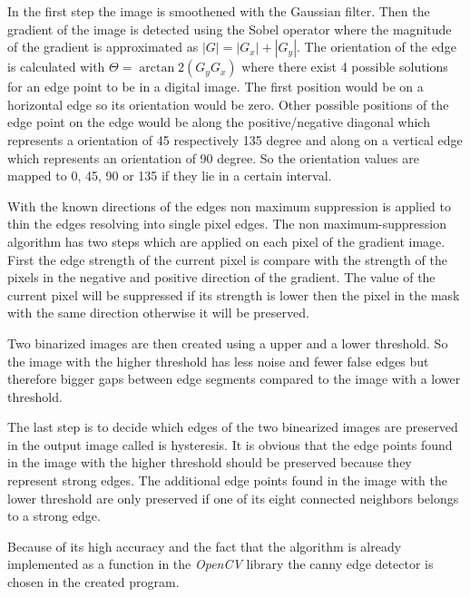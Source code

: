In the first step the image is smoothened with the Gaussian filter. 
Then the gradient of the image is detected using the Sobel operator where the magnitude of the gradient is approximated as $|G| = |G_x| + |G_y|$. 
The orientation of the edge is calculated with $\Theta = \arctan2(G_y G_x)$ where there exist 4 possible solutions for an edge point to be in a digital image. The first position would be on a horizontal edge so its orientation would be zero. Other possible positions of the edge point on the edge would be along the positive/negative diagonal which represents a orientation of 45 respectively 135 degree and along on a vertical edge which represents an orientation of 90 degree. So the orientation values are mapped to 0, 45, 90 or 135 if they lie in a certain interval. 

With the known directions of the edges non maximum suppression is applied to thin the edges resolving into single pixel edges. 
The non maximum-suppression algorithm has two steps which are applied on each pixel of the gradient image. First the edge strength of the current pixel is compare with the strength of the pixels in the negative and positive direction of the gradient. The value of the current pixel will be suppressed if its strength is lower then the pixel in the mask with the same direction otherwise it will be preserved. 

Two binarized images are then created using a upper and a lower threshold. So the image with the higher threshold has less noise and fewer false edges but therefore bigger gaps between edge segments compared to the image with a lower threshold.

The last step is to decide which edges of the two binearized images are preserved in the output image called is hysteresis. It is obvious that the edge points found in the image with the higher threshold should be preserved because they represent strong edges. The additional edge points found in the image with the lower threshold are only preserved if one of its eight connected neighbors belongs to a strong edge.

Because of its high accuracy and the fact that the algorithm is already implemented as a function in the \textit{OpenCV} library the canny edge detector is chosen in the created program. 